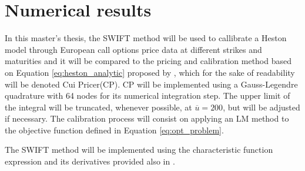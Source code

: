 \documentclass[12,twoside]{mammeTFM}
\theoremstyle{definition}
\theoremstyle{remark}
\begin{document}
\section{Numerical results} \label{chapter:study}

In this master's thesis, the SWIFT method will be used to callibrate a Heston model through European call options price data at different strikes and maturities and it will be compared to the pricing and calibration method based on Equation \ref{eq:heston_analytic} proposed by \cite{cui17}, which for the sake of readability will be denoted Cui Pricer(CP). CP will be implemented using a Gauss-Legendre quadrature with 64 nodes for its numerical integration step. The upper limit of the integral will be truncated, whenever possible, at $\overline{u} = 200$, but will be adjusted if necessary. The calibration process will consist on applying an LM method to the objective function defined in Equation \ref{eq:opt_problem}.

The SWIFT method will be implemented using the characteristic function expression and its derivatives provided also in \cite{cui17}.
\end{document}
